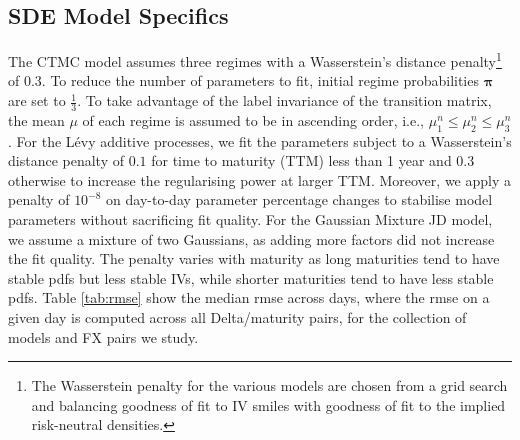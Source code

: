 \documentclass[onefignum,onetabnum]{siamonline190516}
\begin{document}

\subsection{SDE Model Specifics}
\label{sec:SDESpec}

The CTMC model assumes three regimes with a Wasserstein's distance penalty\footnote{The Wasserstein penalty for the various models are chosen from a grid search and balancing goodness of fit to IV smiles with goodness of fit to the implied risk-neutral densities.} of $0.3$. To reduce the number of parameters to fit, initial regime probabilities $\boldsymbol{\pi}$ are set to $\frac13$. To take advantage of the label invariance of the transition matrix, %
the mean $\mu$ of each regime is assumed to be in ascending order, i.e., $\mu_1^n \leq \mu_2^n \leq \mu_3^n$. 
For the L\'evy additive processes, we fit the parameters subject to  a Wasserstein's distance penalty of $0.1$ for time to maturity (TTM) less than 1 year and $0.3$ otherwise to increase the regularising power at larger TTM.   Moreover, we apply a penalty of $10^{-8}$ on day-to-day parameter percentage changes to stabilise model parameters without sacrificing fit quality. For the Gaussian Mixture JD model,  we assume a mixture of two Gaussians, as adding more factors did not increase the fit quality. The penalty varies with maturity as long maturities tend to have stable pdfs but less stable IVs, while shorter maturities tend to have less stable pdfs. Table \ref{tab:rmse} show the median rmse
across days, where the rmse on a given day is computed across all Delta/maturity pairs, for the collection of models and FX pairs we study.
\end{document}

